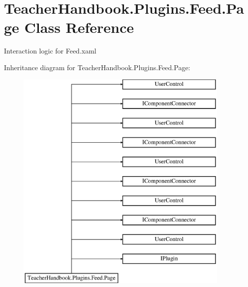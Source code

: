 \hypertarget{class_teacher_handbook_1_1_plugins_1_1_feed_1_1_page}{}\section{Teacher\+Handbook.\+Plugins.\+Feed.\+Page Class Reference}
\label{class_teacher_handbook_1_1_plugins_1_1_feed_1_1_page}


Interaction logic for Feed.\+xaml  


Inheritance diagram for Teacher\+Handbook.\+Plugins.\+Feed.\+Page\+:\begin{figure}[H]
\begin{center}
\leavevmode
\includegraphics[height=11.000000cm]{d4/d8a/class_teacher_handbook_1_1_plugins_1_1_feed_1_1_page}
\end{center}
\end{figure}
